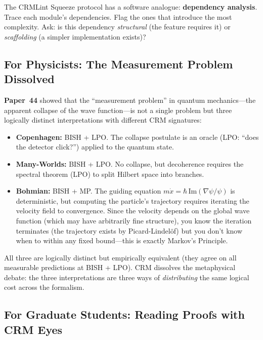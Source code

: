 \documentclass[11pt,twoside,openany]{report}
\theoremstyle{remark}
\newcommand{\BISH}{\textsf{BISH}}
\newcommand{\paperref}[1]{\textbf{Paper~#1}}
\begin{document}
The CRMLint Squeeze protocol has a software analogue: \textbf{dependency analysis}. Trace each module's dependencies. Flag the ones that introduce the most complexity. Ask: is this dependency \emph{structural} (the feature requires it) or \emph{scaffolding} (a simpler implementation exists)?

\subsection*{For Physicists: The Measurement Problem Dissolved}

\paperref{44} showed that the ``measurement problem'' in quantum mechanics---the apparent collapse of the wave function---is not a single problem but three logically distinct interpretations with different CRM signatures:

\begin{itemize}
  \item \textbf{Copenhagen:} \BISH{} + LPO. The collapse postulate is an oracle (LPO: ``does the detector click?'') applied to the quantum state.
  \item \textbf{Many-Worlds:} \BISH{} + LPO. No collapse, but decoherence requires the spectral theorem (LPO) to split Hilbert space into branches.
  \item \textbf{Bohmian:} \BISH{} + MP. The guiding equation $m\dot{x} = \hbar\,\mathrm{Im}(\nabla\psi/\psi)$ is deterministic, but computing the particle's trajectory requires iterating the velocity field to convergence. Since the velocity depends on the global wave function (which may have arbitrarily fine structure), you know the iteration terminates (the trajectory exists by Picard-Lindel\"of) but you don't know when to within any fixed bound---this is exactly Markov's Principle.
\end{itemize}

All three are logically distinct but empirically equivalent (they agree on all measurable predictions at \BISH{} + LPO). CRM dissolves the metaphysical debate: the three interpretations are three ways of \emph{distributing} the same logical cost across the formalism.

\subsection*{For Graduate Students: Reading Proofs with CRM Eyes}
\end{document}
